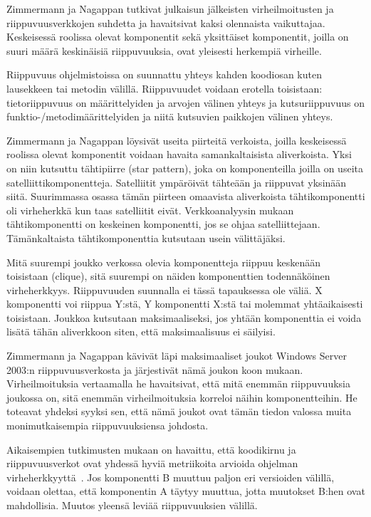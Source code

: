 \documentclass[finnish]{../tktltiki2}
\theoremstyle{definition}
\theoremstyle{remark}
\begin{document}
    Zimmermann ja Nagappan tutkivat julkaisun jälkeisten virheilmoitusten ja riippuvuusverkkojen suhdetta ja havaitsivat 
kaksi olennaista vaikuttajaa. Keskeisessä roolissa olevat komponentit sekä yksittäiset komponentit, joilla on suuri 
määrä keskinäisiä riippuvuuksia, ovat yleisesti herkempiä virheille.

    Riippuvuus ohjelmistoissa on suunnattu yhteys kahden koodiosan kuten lausekkeen tai metodin välillä. Riippuvuudet 
voidaan erotella toisistaan: tietoriippuvuus on määrittelyiden ja arvojen välinen yhteys ja kutsuriippuvuus on 
funktio-/metodimäärittelyiden ja niitä kutsuvien paikkojen välinen yhteys.

    Zimmermann ja Nagappan löysivät useita piirteitä verkoista, joilla keskeisessä roolissa olevat komponentit voidaan 
havaita samankaltaisista aliverkoista. Yksi on niin kutsuttu tähtipiirre (star pattern), joka on komponenteilla joilla 
on useita satelliittikomponentteja. Satelliitit ympäröivät tähteään ja riippuvat yksinään siitä. Suurimmassa osassa 
tämän piirteen omaavista aliverkoista tähtikomponentti oli virheherkkä kun taas satelliitit eivät. Verkkoanalyysin 
mukaan tähtikomponentti on keskeinen komponentti, jos se ohjaa satelliittejaan. Tämänkaltaista tähtikomponenttia 
kutsutaan usein välittäjäksi.

    Mitä suurempi joukko verkossa olevia komponentteja riippuu keskenään toisistaan (clique), sitä suurempi on näiden 
komponenttien todennäköinen virheherkkyys. Riippuvuuden suunnalla ei tässä tapauksessa ole väliä. X komponentti voi 
riippua Y:stä, Y komponentti X:stä tai molemmat yhtäaikaisesti toisistaan. Joukkoa kutsutaan maksimaaliseksi, jos yhtään 
komponenttia ei voida lisätä tähän aliverkkoon siten, että maksimaalisuus ei säilyisi.

    Zimmermann ja Nagappan kävivät läpi maksimaaliset joukot Windows Server 2003:n riippuvuusverkosta ja järjestivät 
nämä joukon koon mukaan. Virheilmoituksia vertaamalla he havaitsivat, että mitä enemmän riippuvuuksia joukossa on, sitä 
enemmän virheilmoituksia korreloi näihin komponentteihin. He toteavat yhdeksi syyksi sen, että nämä joukot ovat tämän 
tiedon valossa muita monimutkaisempia riippuvuuksiensa johdosta.

    Aikaisempien tutkimusten mukaan on havaittu, että koodikirnu ja riippuvuusverkot ovat yhdessä hyviä metriikoita 
arvioida ohjelman virheherkkyyttä~\cite{NB07}. Jos komponentti B muuttuu paljon eri versioiden välillä, voidaan olettaa, 
että komponentin A täytyy muuttua, jotta muutokset B:hen ovat mahdollisia. Muutos yleensä leviää riippuvuuksien välillä.
\end{document}
